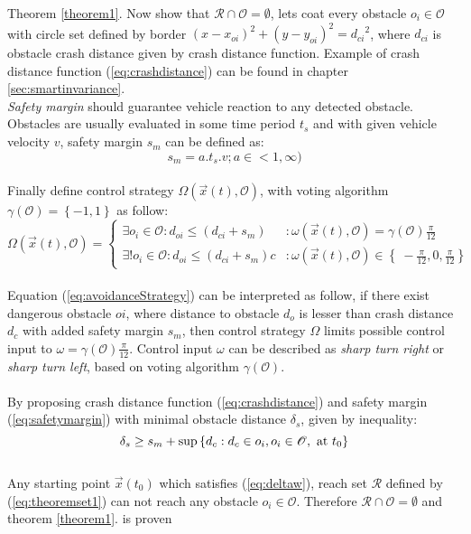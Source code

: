 \begin{dokaz}{Theorem \ref{theorem1}.}
Now show that $\mathscr{R} \cap \mathscr{O} = \emptyset$, lets coat every obstacle $o_i \in \mathscr{O}$ with circle set defined by border $(x - x_{oi})^2 + (y-y_{oi})^2 = {d_{ci}}^2$, where $d_{ci}$ is obstacle crash distance given by crash distance function. Example of crash distance function (\ref{eq:crashdistance}) can be found in chapter \ref{sec:smartinvariance}. 
\\
\textit{Safety margin} should guarantee vehicle reaction to any detected obstacle. Obstacles are usually evaluated in some time period $t_s$ and with given vehicle velocity $v$, safety margin $s_m$ can be defined as:
\begin{equation}\label{eq:safetymargin}
    s_m = a.t_s.v;a \in <1,\infty) 
\end{equation}
\\
Finally define control strategy $\Omega(\vec{x}(t),\mathscr{O})$, with voting algorithm $\gamma(\mathscr{O})=\left\{-1,1\right\}$ as follow:
\begin{equation}\label{eq:avoidanceStrategy}
    \Omega(\vec{x}(t),\mathscr{O}) = 
    \begin{cases}
        \exists o_i \in \mathscr{O}: d_{oi} \le (d_{ci} + s_m) & : \omega(\vec{x}(t),\mathscr{O})=\gamma(\mathscr{O})\frac{\pi}{12}\\
        \exists! o_i \in \mathscr{O}: d_{oi} \le (d_{ci} + s_m)c & : \omega(\vec{x}(t),\mathscr{O}) \in \left\{\ -\frac{\pi}{12},0,\frac{\pi}{12} \right\}
    \end{cases}
\end{equation}
\\
Equation (\ref{eq:avoidanceStrategy}) can be interpreted as follow, if there exist dangerous obstacle $oi$, where distance to obstacle $d_o$ is lesser than crash distance $d_c$ with added safety margin $s_m$, then control strategy $\Omega$ limits possible control input to $\omega = \gamma(\mathscr{O})\frac{\pi}{12}$. Control input $\omega$ can be described as \textit{sharp turn right} or \textit{sharp turn left}, based on voting algorithm $\gamma(\mathscr{O})$.
\\\\
By proposing crash distance function (\ref{eq:crashdistance}) and safety margin (\ref{eq:safetymargin}) with minimal obstacle distance $\delta_s$, given by inequality:
\begin{equation}
    \delta_s \ge s_m + \sup{\left\{d_c:d_c \in o_i, o_i \in \mathscr{O}, \ \textnormal{at}\  t_0\right\}}
\end{equation}
\\Any starting point $\vec{x}(t_0)$ which satisfies (\ref{eq:deltaw}), reach set $\mathscr{R}$ defined by (\ref{eq:theoremset1}) can not reach any obstacle $o_i \in \mathscr{O}$.
Therefore $\mathscr{R} \cap \mathscr{O} = \emptyset$ and theorem \ref{theorem1}. is proven
\end{dokaz}

